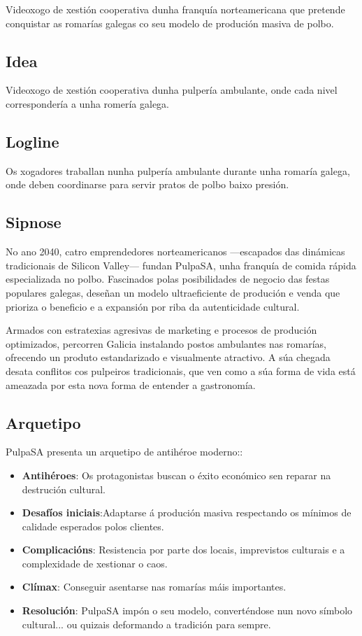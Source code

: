 \documentclass{report}  %
\begin{document}
Videoxogo de xestión cooperativa dunha franquía norteamericana que pretende conquistar as romarías galegas co seu modelo de produción masiva de polbo.
\subsection{Idea}

Videoxogo de xestión cooperativa dunha pulpería ambulante, onde cada nivel correspondería a unha romería galega.

\subsection{Logline}

Os xogadores traballan nunha pulpería ambulante durante unha romaría galega, onde deben coordinarse para servir pratos de polbo baixo presión.

\subsection{Sipnose}

No ano 2040, catro emprendedores norteamericanos —escapados das dinámicas tradicionais de Silicon Valley— fundan PulpaSA, unha franquía de comida rápida especializada no polbo. Fascinados polas posibilidades de negocio das festas populares galegas, deseñan un modelo ultraeficiente de produción e venda que prioriza o beneficio e a expansión por riba da autenticidade cultural.

Armados con estratexias agresivas de marketing e procesos de produción optimizados, percorren Galicia instalando postos ambulantes nas romarías, ofrecendo un produto estandarizado e visualmente atractivo. A súa chegada desata conflitos cos pulpeiros tradicionais, que ven como a súa forma de vida está ameazada por esta nova forma de entender a gastronomía.

\subsection{Arquetipo}

PulpaSA presenta un arquetipo de antihéroe moderno::
\begin{itemize}
    \item \textbf{Antihéroes}: Os protagonistas buscan o éxito económico sen reparar na destrución cultural.
    \item \textbf{Desafíos iniciais}:Adaptarse á produción masiva respectando os mínimos de calidade esperados polos clientes.
    \item \textbf{Complicacións}: Resistencia por parte dos locais, imprevistos culturais e a complexidade de xestionar o caos.
    \item \textbf{Clímax}: Conseguir asentarse nas romarías máis importantes.
    \item \textbf{Resolución}: PulpaSA impón o seu modelo, converténdose nun novo símbolo cultural... ou quizais deformando a tradición para sempre.
\end{itemize}
\end{document}
